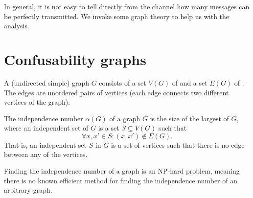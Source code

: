 In general, it is not easy to tell directly from the channel how many messages can be perfectly transmitted. We invoke some graph theory to help us with the analysis.

\section{Confusability graphs}

\begin{definition}[Graph]
A (undirected simple) graph $G$ consists of a set $V(G)$ of  and a set $E(G)$ of . The edges are unordered pairs of vertices (each edge connects two different vertices of the graph).
\end{definition}

\begin{definition}
The independence number $\alpha(G)$ of a graph $G$ is the size of the largest  of $G$, where an independent set of $G$ is a set $S \subseteq V(G)$ such that
\[
\forall x, x' \in S: (x,x') \not\in E(G).
\]
That is, an independent set $S$ in $G$ is a set of vertices such that there is no edge between any of the vertices.
\end{definition}
Finding the independence number of a graph is an NP-hard problem, meaning there is no known efficient method for finding the independence number of an arbitrary graph.

